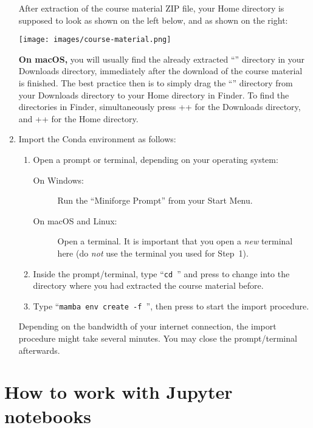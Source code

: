 \documentclass[12pt,a4paper]{article}
\let\Alt=\relax
\begin{document}
\begin{enumerate}
    After extraction of the course material ZIP file, your Home directory is supposed to look as shown on the left below, and \underline{} as shown on the right:\\[0.5em]
    \begin{minipage}{\linewidth}
        \texttt{[image: images/course-material.png]}
    \end{minipage}

    \textbf{On macOS,} you will usually find the already extracted ``\texttt{{\projectid}}'' directory in your Downloads directory, immediately after the download of the course material is finished. The best practice then is to simply drag the ``\texttt{{\projectid}}'' directory from your Downloads directory to your Home directory in Finder. To find the directories in Finder, simultaneously press \keystroke{\Alt}+\keystroke{\cmd}+ for the Downloads directory, and \keystroke{\shift}+\keystroke{\cmd}+ for the Home directory.
\item Import the Conda environment as follows:
    \begin{enumerate}
        \item Open a prompt or terminal, depending on your operating system:
        \begin{description}
            \item[On Windows:] Run the ``Miniforge Prompt'' from your Start Menu.
            \item[On macOS and Linux:] Open a terminal. It is important that you open a \emph{new} terminal here (do \emph{not} use the terminal you used for Step~1).
        \end{description}
        \item Inside the prompt/terminal, type ``\texttt{cd {\projectid}}'' and press \Return to change into the directory where you had extracted the course material before.
        \item Type ``\texttt{mamba env create -f {\ymlfile}}'', then press \Return to start the import procedure.
    \end{enumerate}
    
    Depending on the bandwidth of your internet connection, the import procedure might take several minutes. You may close the prompt/terminal afterwards.
\end{enumerate}

\section{How to work with Jupyter notebooks}
\label{task:jupyter}
\end{document}
